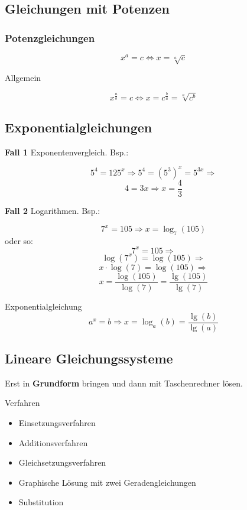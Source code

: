 \newpage
\begin{multicols}{2}


\subsection{Gleichungen mit Potenzen}
\subsubsection{Potenzgleichungen}

$$x^a=c \Leftrightarrow x=\sqrt[a]{c}$$

Allgemein

$$x^{\frac{a}b} = c \Leftrightarrow{}
x=c^{\frac{b}a} = \sqrt[a]{c^b}$$

\subsection{Exponentialgleichungen}
\textbf{Fall 1} Exponentenvergleich. Bsp.:

$$5^4=125^x \Rightarrow{} 5^4=(5^3)^x=5^{3x} \Rightarrow{}$$
$$ 4=3x \Rightarrow x=\frac43$$

\textbf{Fall 2} Logarithmen. Bsp.:

$$7^x=105 \Rightarrow x=\log_7(105)$$
oder so:
$$7^x=105 \Rightarrow$$
$$ \log(7^x)=\log(105) \Rightarrow$$
$$x\cdot{}\log(7)=\log(105) \Rightarrow$$
$$ x=\frac{\log(105)}{\log(7)} = \frac{\lg(105)}{\lg(7)}$$

\begin{gesetz}{Exponentialgleichung}{}
$$a^x=b \Rightarrow{} x=\log_a(b) = \frac{\lg(b)}{\lg(a)}$$
\end{gesetz}


\subsection{Lineare Gleichungssysteme}
Erst in \textbf{Grundform} bringen und dann
mit Taschenrechner  lösen.

Verfahren
\begin{itemize}
\item Einsetzungsverfahren
\item Additionsverfahren
\item Gleichsetzungsverfahren
\item Graphische Lösung mit zwei Geradengleichungen
\item Substitution
\end{itemize}


\end{multicols}

